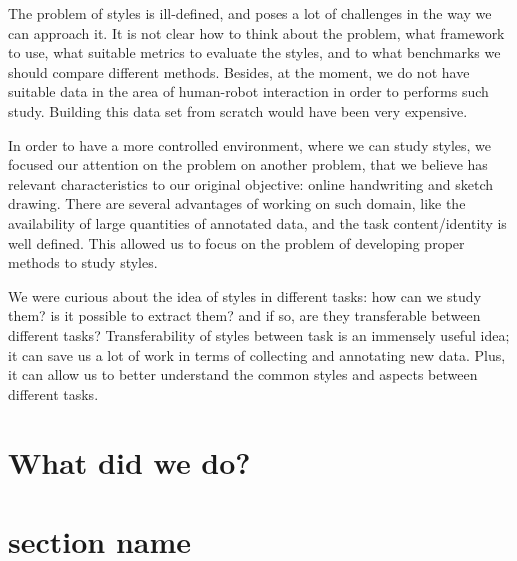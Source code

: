 \par The problem of styles is ill-defined, and poses a lot of challenges in the way we can approach it. It is not clear how to think about the problem, what framework to use, what suitable metrics to evaluate the styles, and to what benchmarks we should compare different methods. Besides, at the moment, we do not have suitable data in the area of human-robot interaction in order to performs such study. Building this data set from scratch would have been very expensive.

\par In order to have a more controlled environment, where we can study styles, we focused our attention on the problem on another problem, that we believe has relevant characteristics to our original objective: online handwriting and sketch drawing. There are several advantages of working on such domain, like the availability of large quantities of annotated data, and the task content/identity is well defined. This allowed us to focus on the problem of developing proper methods to study styles.

\par We were curious about the idea of styles in different tasks: how can we study them? is it possible to extract them? and if so, are they transferable between different tasks? Transferability of styles between task is an immensely useful idea; it can save us a lot of work in terms of collecting and annotating new data. Plus, it can allow us to better understand the common styles and aspects between different tasks.

\section{What did we do?}

\section{section name}
